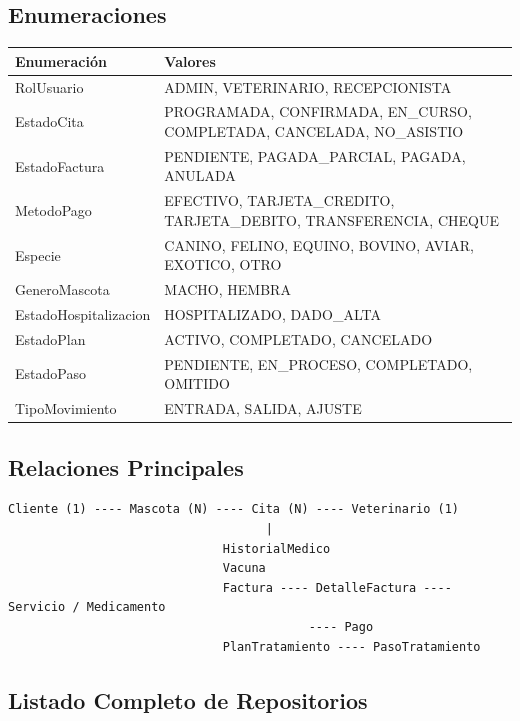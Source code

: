 \subsection{Enumeraciones}

\begin{longtable}{|p{4cm}|p{10cm}|}
\hline
\textbf{Enumeraci\'on} & \textbf{Valores} \\
\hline
RolUsuario & ADMIN, VETERINARIO, RECEPCIONISTA \\
EstadoCita & PROGRAMADA, CONFIRMADA, EN\_CURSO, COMPLETADA, CANCELADA, NO\_ASISTIO \\
EstadoFactura & PENDIENTE, PAGADA\_PARCIAL, PAGADA, ANULADA \\
MetodoPago & EFECTIVO, TARJETA\_CREDITO, TARJETA\_DEBITO, TRANSFERENCIA, CHEQUE \\
Especie & CANINO, FELINO, EQUINO, BOVINO, AVIAR, EXOTICO, OTRO \\
GeneroMascota & MACHO, HEMBRA \\
EstadoHospitalizacion & HOSPITALIZADO, DADO\_ALTA \\
EstadoPlan & ACTIVO, COMPLETADO, CANCELADO \\
EstadoPaso & PENDIENTE, EN\_PROCESO, COMPLETADO, OMITIDO \\
TipoMovimiento & ENTRADA, SALIDA, AJUSTE \\
\hline
\end{longtable}

\subsection{Relaciones Principales}

\begin{verbatim}
Cliente (1) ---- Mascota (N) ---- Cita (N) ---- Veterinario (1)
                                    |
                              HistorialMedico
                              Vacuna
                              Factura ---- DetalleFactura ---- Servicio / Medicamento
                                          ---- Pago
                              PlanTratamiento ---- PasoTratamiento
\end{verbatim}

\subsection{Listado Completo de Repositorios}

